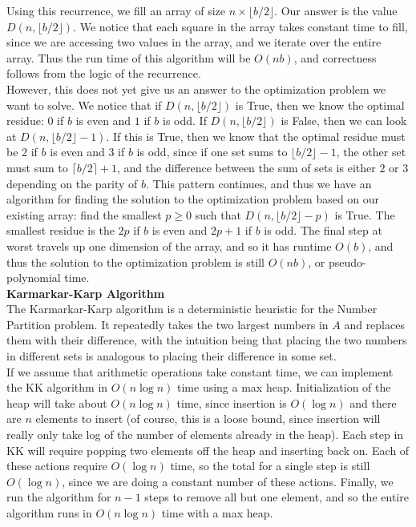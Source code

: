 \documentclass[12pt]{article}
\begin{document}
Using this recurrence, we fill an array of size $n \times \lfloor b/2 \rfloor$. Our answer is the value $D(n, \lfloor b/2 \rfloor)$. We notice that each square in the array takes constant time to fill, since we are accessing two values in the array, and we iterate over the entire array. Thus the run time of this algorithm will be $O(nb)$, and correctness follows from the logic of the recurrence. \\

However, this does not yet give us an answer to the optimization problem we want to solve. We notice that if $D(n, \lfloor b/2 \rfloor)$ is True, then we know the optimal residue: $0$ if $b$ is even and $1$ if $b$ is odd. If $D(n, \lfloor b/2 \rfloor)$ is False, then we can look at $D(n, \lfloor b/2 \rfloor - 1)$. If this is True, then we know that the optimal residue must be $2$ if $b$ is even and $3$ if $b$ is odd, since if one set sums to $\lfloor b/2 \rfloor - 1$, the other set must sum to $\lceil b/2 \rceil + 1$, and the difference between the sum of sets is either $2$ or $3$ depending on the parity of $b$. This pattern continues, and thus we have an algorithm for finding the solution to the optimization problem based on our existing array: find the smallest $p \ge 0$ such that $D(n, \lfloor b/2 \rfloor - p)$ is True. The smallest residue is the $2p$ if $b$ is even and $2p+1$ if $b$ is odd. The final step at worst travels up one dimension of the array, and so it has runtime $O(b)$, and thus the solution to the optimization problem is still $O(nb)$, or pseudo-polynomial time. \\

\textbf{Karmarkar-Karp Algorithm} \\
The Karmarkar-Karp algorithm is a deterministic heuristic for the Number Partition problem. It repeatedly takes the two largest numbers in $A$ and replaces them with their difference, with the intuition being that placing the two numbers in different sets is analogous to placing their difference in some set. \\

If we assume that arithmetic operations take constant time, we can implement the KK algorithm in $O(n \log n)$ time using a max heap. Initialization of the heap will take about $O(n \log n)$ time, since insertion is $O(\log n)$ and there are $n$ elements to insert (of course, this is a loose bound, since insertion will really only take log of the number of elements already in the heap). Each step in KK will require popping two elements off the heap and inserting back on. Each of these actions require $O(\log n)$ time, so the total for a single step is still $O(\log n)$, since we are doing a constant number of these actions. Finally, we run the algorithm for $n - 1$ steps to remove all but one element, and so the entire algorithm runs in $O(n \log n)$ time with a max heap. \\
\end{document}
